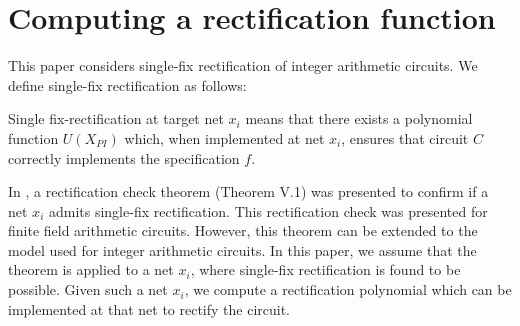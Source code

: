 \section{Computing a rectification function}

This paper considers single-fix rectification of integer arithmetic circuits. We define single-fix rectification as follows:

\begin{Definition}
Single  fix-rectification  at  target  net $x_i$ means  that  there  exists  a  polynomial  function $U(X_{PI})$ which,  when implemented  at  net $x_i$,  ensures  that circuit $C$ correctly implements the specification $f$.
\end{Definition}

In \cite{utkarsh:fmcad18}, a rectification check theorem (Theorem V.1) was presented to confirm if a net $x_i$ admits single-fix rectification. This rectification check was presented for finite field arithmetic circuits. However, this theorem can be extended to the model used for integer arithmetic circuits. In this paper, we assume that the theorem is applied to a net $x_i$, where single-fix rectification is found to be possible. Given such a net $x_i$, we compute a rectification polynomial which can be implemented at that net to rectify the circuit. 



